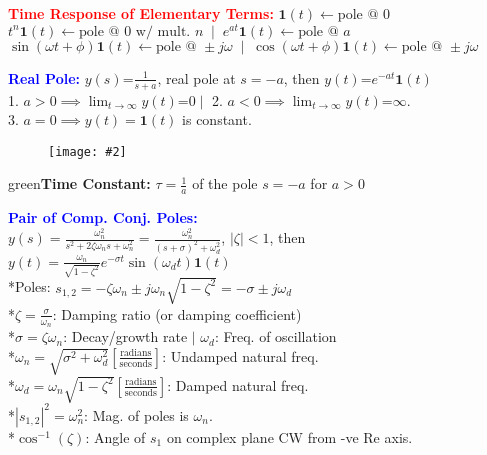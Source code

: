\documentclass[5pt]{extarticle} %
\newcommand{\customFigure}[3][]{%
    \vspace{-1.5em}
    \begin{figure}[H]
        \centering
        \texttt{[image: \#2]}
    \end{figure}
    \vspace{-1.5em}
}
\begin{document}
\begin{paracol}{3}
{    \textcolor{red}{\textbf{Time Response of Elementary Terms:}} $\mathbf{1}(t) \leftarrow \text{pole @ 0}$ \\
    $t^n \mathbf{1}(t) \leftarrow \text{pole @ $0$ w/ mult. $n$} \; \mid \; e^{at} \mathbf{1}(t) \leftarrow \text{pole @ } a$ \\
    $\sin(\omega t + \phi) \mathbf{1}(t) \leftarrow \text{pole @ } \pm j \omega \; \mid \; \cos(\omega t + \phi) \mathbf{1}(t) \leftarrow \text{pole @ } \pm j \omega$ 

    \textcolor{blue}{\textbf{Real Pole:}} $y(s) \text{=} \frac{1}{s+a}$, real pole at $s = -a$, then $y(t) \text{=} e^{-at} \mathbf{1}(t)$ \\
    1. $a>0 \implies \lim_{t \rightarrow \infty} y(t) \text{=} 0 \mid$ 2. $a<0 \implies \lim_{t \rightarrow \infty} y(t) \text{=} \infty$. \\
    3. $a=0 \implies y(t) = \mathbf{1}(t)$ is constant.
    \customFigure[0.1]{../Images/L10_0.png}

    \textcolor{green}{\textbf{Time Constant:}} $\tau = \frac{1}{a}$ of the pole $s=-a$ for $a>0$

    \textcolor{blue}{\textbf{Pair of Comp. Conj. Poles:}} \\
    $y(s) = \frac{\omega_n^2}{s^2 + 2\zeta\omega_n s + \omega_n^2} = \frac{\omega_n^2}{(s + \sigma)^2 + \omega_d^2}$, $|\zeta| < 1$, then \\
    $y(t) = \frac{\omega_n}{\sqrt{1 - \zeta^2}} e^{-\sigma t} \sin(\omega_d t) \mathbf{1}(t)$ \\
    *Poles: $s_{1,2} = - \zeta \omega_n \pm j \omega_n \sqrt{1 - \zeta^2} = -\sigma \pm j \omega_d$ \\
    *$\zeta = \frac{\sigma}{\omega_n}$: Damping ratio (or damping coefficient) \\
    *$\sigma = \zeta \omega_n$: Decay/growth rate $\mid$ $\omega_d$: Freq. of oscillation \\
    *$\omega_n = \sqrt{\sigma^2 + \omega_d^2} \left[\frac{\text{radians}}{\text{seconds}} \right]$: Undamped natural freq. \\
    *$\omega_d = \omega_n \sqrt{1 - \zeta^2} \left[\frac{\text{radians}}{\text{seconds}} \right]$: Damped natural freq. \\
    *$|s_{1,2}|^2 = \omega_n^2$: Mag. of poles is $\omega_n$. \\
    *$\cos^{-1}(\zeta)$: Angle of $s_1$ on complex plane CW from -ve $\text{Re}$ axis. \\


}
\end{paracol}
\end{document}
